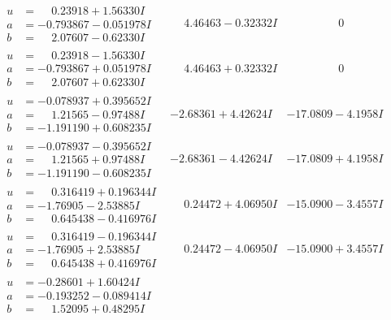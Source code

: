 \documentclass[1p]{elsarticle_modified}
\theoremstyle{definition}
\begin{document}
$$\begin{array}{c|c|c}
\begin{aligned}
u &= \phantom{-}0.23918 + 1.56330 I \\
a &= -0.793867 - 0.051978 I \\
b &= \phantom{-}2.07607 - 0.62330 I\end{aligned}
 & \phantom{-}4.46463 - 0.32332 I & \phantom{-0.000000 } 0 \\ \hline\begin{aligned}
u &= \phantom{-}0.23918 - 1.56330 I \\
a &= -0.793867 + 0.051978 I \\
b &= \phantom{-}2.07607 + 0.62330 I\end{aligned}
 & \phantom{-}4.46463 + 0.32332 I & \phantom{-0.000000 } 0 \\ \hline\begin{aligned}
u &= -0.078937 + 0.395652 I \\
a &= \phantom{-}1.21565 - 0.97488 I \\
b &= -1.191190 + 0.608235 I\end{aligned}
 & -2.68361 + 4.42624 I & -17.0809 - 4.1958 I \\ \hline\begin{aligned}
u &= -0.078937 - 0.395652 I \\
a &= \phantom{-}1.21565 + 0.97488 I \\
b &= -1.191190 - 0.608235 I\end{aligned}
 & -2.68361 - 4.42624 I & -17.0809 + 4.1958 I \\ \hline\begin{aligned}
u &= \phantom{-}0.316419 + 0.196344 I \\
a &= -1.76905 - 2.53885 I \\
b &= \phantom{-}0.645438 - 0.416976 I\end{aligned}
 & \phantom{-}0.24472 + 4.06950 I & -15.0900 - 3.4557 I \\ \hline\begin{aligned}
u &= \phantom{-}0.316419 - 0.196344 I \\
a &= -1.76905 + 2.53885 I \\
b &= \phantom{-}0.645438 + 0.416976 I\end{aligned}
 & \phantom{-}0.24472 - 4.06950 I & -15.0900 + 3.4557 I \\ \hline\begin{aligned}
u &= -0.28601 + 1.60424 I \\
a &= -0.193252 - 0.089414 I \\
b &= \phantom{-}1.52095 + 0.48295 I\end{aligned}

\end{array}$$
\end{document}

